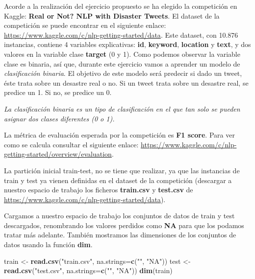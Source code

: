 \documentclass[
]{article}
\newenvironment{Shaded}{\begin{snugshade}}{\end{snugshade}}
\newcommand{\DataTypeTok}[1]{\textcolor[rgb]{0.13,0.29,0.53}{#1}}
\newcommand{\KeywordTok}[1]{\textcolor[rgb]{0.13,0.29,0.53}{\textbf{#1}}}
\newcommand{\NormalTok}[1]{#1}
\newcommand{\StringTok}[1]{\textcolor[rgb]{0.31,0.60,0.02}{#1}}
\begin{document}
Acorde a la realización del ejercicio propuesto se ha elegido la
competición en Kaggle: \textbf{Real or Not? NLP with Disaster Tweets}.
El dataset de la competición se puede encontrar en el siguiente enlace:
\url{https://www.kaggle.com/c/nlp-getting-started/data}. Este dataset,
con 10.876 instancias, contiene 4 variables explicativas: \textbf{id},
\textbf{keyword}, \textbf{location} y \textbf{text}, y dos valores en la
variable clase \textbf{target} (0 y 1). Como podemos observar la
variable clase es binaria, así que, durante este ejercicio vamos a
aprender un modelo de \emph{clasificación binaria}. El objetivo de este
modelo será predecir si dado un tweet, éste trata sobre un desastre real
o no. Si un tweet trata sobre un desastre real, se predice un 1. Si no,
se predice un 0.

\emph{La clasificación binaria es un tipo de clasificación en el que tan
solo se pueden asignar dos clases diferentes (0 o 1).}

La métrica de evaluación esperada por la competición es \textbf{F1
score}. Para ver como se calcula consultar el siguiente enlace:
\url{https://www.kaggle.com/c/nlp-getting-started/overview/evaluation}.

La partición inicial train-test, no se tiene que realizar, ya que las
instancias de train y test ya vienen definidas en el dataset de la
competición (descargar a nuestro espacio de trabajo los ficheros
\textbf{train.csv} y \textbf{test.csv} de
\url{https://www.kaggle.com/c/nlp-getting-started/data}).

Cargamos a nuestro espacio de trabajo los conjuntos de datos de train y
test descargados, renombrando los valores perdidos como \textbf{NA} para
que los podamos tratar más adelante. También mostramos las dimensiones
de los conjuntos de datos usando la función \textbf{dim}.

\begin{Shaded}
\begin{Highlighting}[]
\NormalTok{train <-}\StringTok{ }\KeywordTok{read.csv}\NormalTok{(}\StringTok{"train.csv"}\NormalTok{, }\DataTypeTok{na.strings=}\KeywordTok{c}\NormalTok{(}\StringTok{""}\NormalTok{, }\StringTok{"NA"}\NormalTok{))}
\NormalTok{test <-}\StringTok{ }\KeywordTok{read.csv}\NormalTok{(}\StringTok{"test.csv"}\NormalTok{, }\DataTypeTok{na.strings=}\KeywordTok{c}\NormalTok{(}\StringTok{""}\NormalTok{, }\StringTok{"NA"}\NormalTok{))}
\KeywordTok{dim}\NormalTok{(train)}
\end{Highlighting}
\end{Shaded}
\end{document}
